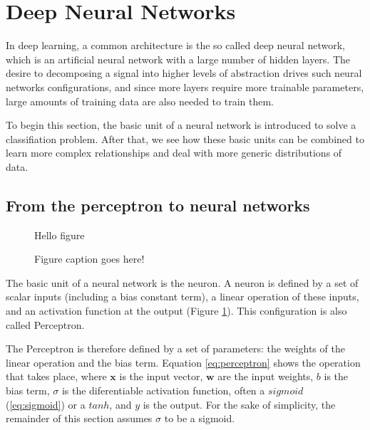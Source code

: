 
\section{Deep Neural Networks}


In deep learning, a common architecture is the so called deep neural network, which is an artificial neural network with a large number of hidden layers. The desire to decomposing a signal into higher levels of abstraction drives such neural networks configurations, and since more layers require more trainable parameters, large amounts of training data are also needed to train them.

To begin this section, the basic unit of a neural network is introduced to solve a classifiation problem. After that, we see how these basic units can be combined to learn more complex relationships and deal with more generic distributions of data.

\subsection{From the perceptron to neural networks}

\begin{figure}
    \centering
    Hello figure
    \caption{Figure caption goes here!}
    \label{fig:perceptron}
\end{figure}

The basic unit of a neural network is the neuron. A neuron is defined by a set of scalar inputs (including a bias constant term), a linear operation of these inputs, and an activation function at the output (Figure \ref{fig:perceptron}). This configuration is also called Perceptron.

The Perceptron is therefore defined by a set of parameters: the weights of the linear operation and the bias term. Equation \ref{eq:perceptron} shows the operation that takes place, where $\mathbf{x}$ is the input vector, $\mathbf{w}$ are the input weights, $b$ is the bias term, $\sigma$ is the diferentiable activation function, often a $sigmoid$ (\ref{eq:sigmoid}) or a $tanh$, and $y$ is the output. For the sake of simplicity, the remainder of this section assumes $\sigma$ to be a sigmoid.

